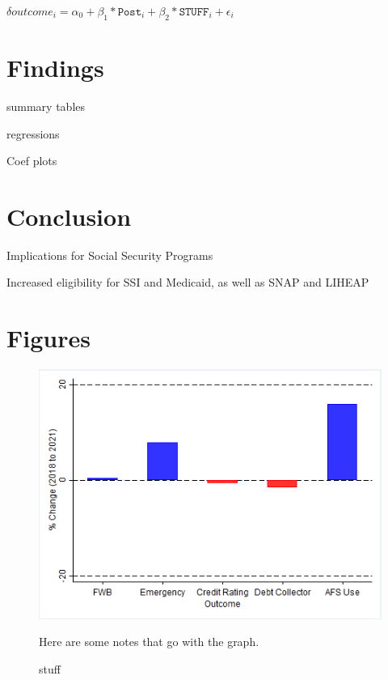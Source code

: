 \documentclass[12pt]{article}
\begin{document}
$\delta outcome_{i} = \alpha_0 + \beta_1*\texttt{Post}_i + \beta_2*\texttt{STUFF}_i + \epsilon_i $

 

\section{Findings}

summary tables

regressions

Coef plots
 

 
  

\section{Conclusion}
 
Implications for Social Security Programs
 
Increased eligibility for SSI and Medicaid, as well as SNAP and LIHEAP
 

\section{Figures}
 
 

\begin{figure}[!ht]\label{stuff}
\caption{stuff}
\centering
\includegraphics[scale=0.65]{ChangeY_18_21_nodisability.png}
\medskip 
\begin{minipage}{0.65\textwidth} 
{\footnotesize Here are some notes that go with the graph.  \par}
\end{minipage}
\end{figure}
\end{document}
